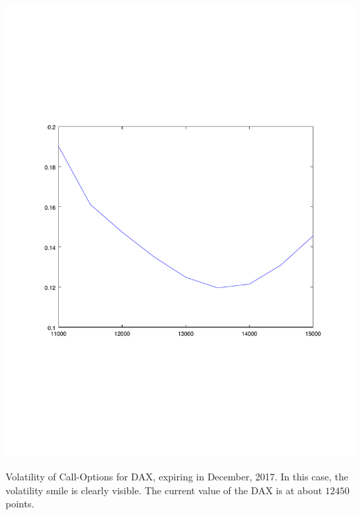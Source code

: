 \documentclass[10pt,a4paper]{article}
\begin{document}
\begin{center}
	\includegraphics[scale=0.45]{images/DAX.pdf}
\end{center}

Volatility of Call-Options for DAX, expiring in December, 2017. In this case, the volatility smile is clearly visible. The current value of the DAX is at about $12450$ points. 
\end{document}
